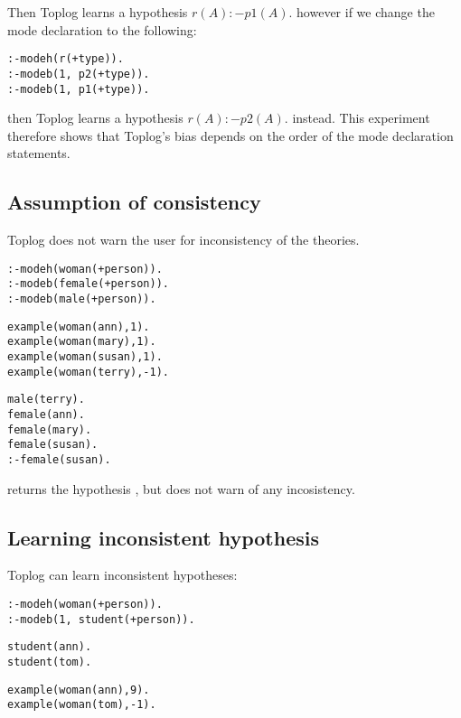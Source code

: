 Then Toplog learns a hypothesis $r(A) :- p1(A).$ however if we change the mode declaration to the following:
\begin{lstlisting}
:-modeh(r(+type)).
:-modeb(1, p2(+type)).
:-modeb(1, p1(+type)).
\end{lstlisting}
then Toplog learns a hypothesis $r(A) :- p2(A).$ instead. This experiment therefore shows that Toplog's bias depends on the order of the mode declaration statements.

\subsection{Assumption of consistency}\label{toplog_consistency_assumption}
Toplog does not warn the user for inconsistency of the theories.

\begin{minipage}[t]{.30\textwidth}
\begin{lstlisting}
:-modeh(woman(+person)).
:-modeb(female(+person)).
:-modeb(male(+person)).
\end{lstlisting}
\end{minipage}
\begin{minipage}[t]{.35\textwidth}
\begin{lstlisting}
example(woman(ann),1).
example(woman(mary),1).
example(woman(susan),1).
example(woman(terry),-1).
\end{lstlisting}
\end{minipage}
\begin{minipage}[t]{.30\textwidth}
\begin{lstlisting}
male(terry).
female(ann).
female(mary).
female(susan).
:-female(susan).
\end{lstlisting}
\end{minipage}

returns the hypothesis , but does not warn of any incosistency.

\subsection{Learning inconsistent hypothesis}
Toplog can learn inconsistent hypotheses:

\begin{minipage}[t]{.40\textwidth}
\begin{lstlisting}
:-modeh(woman(+person)).
:-modeb(1, student(+person)).
\end{lstlisting}
\end{minipage}
\begin{minipage}[t]{.20\textwidth}
\begin{lstlisting}
student(ann).
student(tom).
\end{lstlisting}
\end{minipage}
\begin{minipage}[t]{.20\textwidth}
\begin{lstlisting}
example(woman(ann),9).
example(woman(tom),-1).
\end{lstlisting}
\end{minipage}


